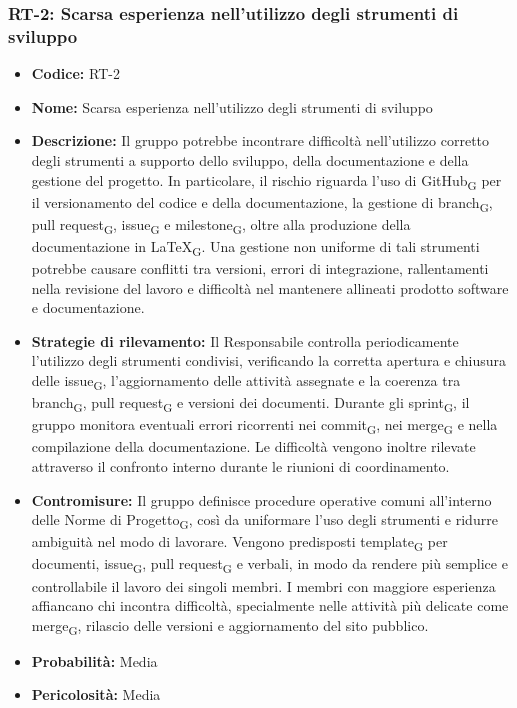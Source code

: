 \documentclass[a4paper, 10pt, colorlinks=true, linkcolor=black, urlcolor=blue, citecolor=blue, hidelinks]{article}
\begin{document}
\subsubsection{RT-2: Scarsa esperienza nell'utilizzo degli strumenti di sviluppo}

\begin{itemize}
    \item \textbf{Codice:} RT-2

    \item \textbf{Nome:} Scarsa esperienza nell'utilizzo degli strumenti di sviluppo

    \item \textbf{Descrizione:} Il gruppo potrebbe incontrare difficoltà nell'utilizzo corretto degli strumenti a supporto dello sviluppo, della documentazione e della gestione del progetto. In particolare, il rischio riguarda l'uso di GitHub\textsubscript{G} per il versionamento del codice e della documentazione, la gestione di branch\textsubscript{G}, pull request\textsubscript{G}, issue\textsubscript{G} e milestone\textsubscript{G}, oltre alla produzione della documentazione in LaTeX\textsubscript{G}. Una gestione non uniforme di tali strumenti potrebbe causare conflitti tra versioni, errori di integrazione, rallentamenti nella revisione del lavoro e difficoltà nel mantenere allineati prodotto software e documentazione.

    \item \textbf{Strategie di rilevamento:} Il Responsabile controlla periodicamente l'utilizzo degli strumenti condivisi, verificando la corretta apertura e chiusura delle issue\textsubscript{G}, l'aggiornamento delle attività assegnate e la coerenza tra branch\textsubscript{G}, pull request\textsubscript{G} e versioni dei documenti. Durante gli sprint\textsubscript{G}, il gruppo monitora eventuali errori ricorrenti nei commit\textsubscript{G}, nei merge\textsubscript{G} e nella compilazione della documentazione. Le difficoltà vengono inoltre rilevate attraverso il confronto interno durante le riunioni di coordinamento.

    \item \textbf{Contromisure:} Il gruppo definisce procedure operative comuni all'interno delle Norme di Progetto\textsubscript{G}, così da uniformare l'uso degli strumenti e ridurre ambiguità nel modo di lavorare. Vengono predisposti template\textsubscript{G} per documenti, issue\textsubscript{G}, pull request\textsubscript{G} e verbali, in modo da rendere più semplice e controllabile il lavoro dei singoli membri. I membri con maggiore esperienza affiancano chi incontra difficoltà, specialmente nelle attività più delicate come merge\textsubscript{G}, rilascio delle versioni e aggiornamento del sito pubblico.

    \item \textbf{Probabilità:} Media

    \item \textbf{Pericolosità:} Media
\end{itemize}
\end{document}
